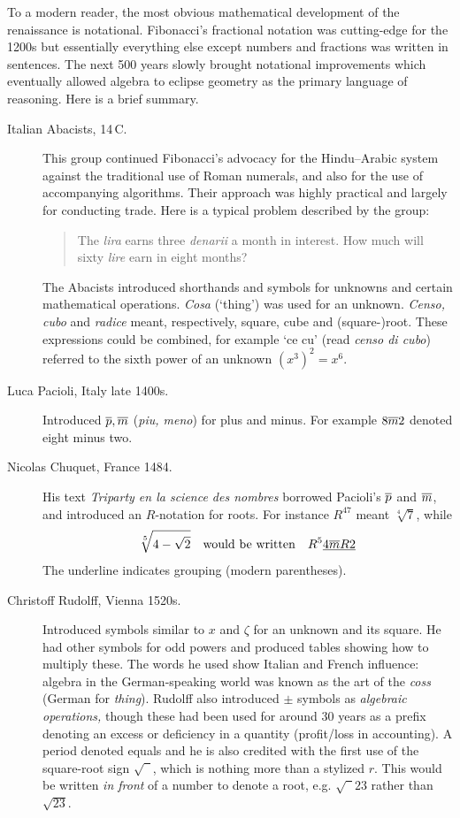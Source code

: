 \goodbreak




To a modern reader, the most obvious mathematical development of the renaissance is notational. Fibonacci's fractional notation was cutting-edge for the 1200s but essentially everything else except numbers and fractions was written in sentences. The next 500 years slowly brought notational improvements which eventually allowed algebra to eclipse geometry as the primary language of reasoning. Here is a brief summary.

\begin{description}
	\item[Italian Abacists, 14\th\,C.] This group continued Fibonacci's advocacy for the Hindu--Arabic system against the traditional use of Roman numerals, and also for the use of accompanying algorithms. Their approach was highly practical and largely for conducting trade. Here is a typical problem described by the group:
  \begin{quote}
  The \emph{lira} earns three \emph{denarii} a month in interest. How much will sixty \emph{lire} earn in eight months?
  \end{quote}
  The Abacists introduced shorthands and symbols for unknowns and certain mathematical operations. \emph{Cosa} (`thing') was used for an unknown. \emph{Censo, cubo} and \emph{radice} meant, respectively, square, cube and (square-)root. These expressions could be combined, for example `ce cu' (read \emph{censo di cubo}) referred to the sixth power of an unknown $(x^3)^2=x^6$.
  
  \item[Luca Pacioli, Italy late 1400s.] Introduced $\overline{p},\overline{m}$ (\emph{piu, meno}) for plus and minus. For example $8\overline{m} 2$ denoted eight minus two. 
  
  \item[Nicolas Chuquet, France 1484.] His text \emph{Triparty en la science des nombres} borrowed Pacioli's $\overline{p}$ and $\overline{m}$, and introduced an $R$-notation for roots. For instance $R^47$ meant $\sqrt[4]7$, while
  \[
  	\sqrt[5]{4-\sqrt 2}\quad\text{would be written}\quad R^5\underline{4\overline{m}R2}
  \]
  The underline indicates grouping (modern parentheses).
  
	\item[Christoff Rudolff, Vienna 1520s.] Introduced symbols similar to $x$ and $\zeta$ for an unknown and its square. He had other symbols for odd powers and produced tables showing how to multiply these. The words he used show Italian and French influence: algebra in the German-speaking world was known as the art of the \emph{coss} (German for \emph{thing}). Rudolff also introduced $\pm$ symbols as \emph{algebraic operations,} though these had been used for around 30 years as a prefix denoting an excess or deficiency in a quantity (profit/loss in accounting). A period denoted equals and he is also credited with the first use of the square-root sign $\sqrt{\phantom 1\!\!}$, which is nothing more than a stylized $r$. This would be written \emph{in front} of a number to denote a root, e.g. $\sqrt{\phantom 1\!\!}23$ rather than $\sqrt{23}$.
	

\end{description}
